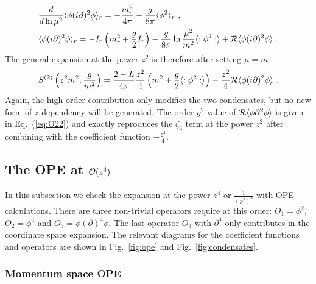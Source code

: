 \documentclass[a4paper,11pt]{article}
\begin{document}
\begin{align}
&\frac{d}{d \ln \mu^2}\langle \phi(i\partial)^2\phi\rangle_r=-\frac{m_r^2}{4\pi}-\frac{g}{8\pi}\langle\phi^2 \rangle_r \ , \\  
&\langle \phi(i\partial)^2\phi\rangle_r=-I_r\left(m_r^2+\frac{g}{2}I_r\right)-\frac{g}{8\pi}\ln\frac{\mu^2}{m^2}\langle :\phi^2:\rangle+{\cal R}\langle \phi (i\partial)^2\phi \rangle \ .
\end{align}
The general expansion at the power $z^2$ is therefore after setting $\mu=m$
\begin{align}
S^{(2)}\left(z^2m^2,\frac{g}{m^2}\right)=\frac{2-L}{4\pi}\frac{z^2}{4}\left(m^2+\frac{g}{2}\langle :\phi^2:\rangle\right)-\frac{z^2}{4}{\cal R}\langle \phi (i\partial)^2\phi \rangle \ . 
\end{align}
Again, the high-order contribution only modifies the two condensates, but no new form of $z$ dependency will be generated.  The order $g^2$ value of ${\cal R}\langle \phi \partial^2\phi\rangle$ is given in Eq.~(\ref{eq:O22}) and exactly reproduces the $\zeta_3$ term at the power $z^2$ after combining with the coefficient function $-\frac{z^2}{4}$. 




\subsection{The OPE at ${\cal O}(z^4)$}
In this subsection we check the expansion at the power $z^4$ or $\frac{1}{(p^2)^3}$
with OPE calculations. There are three non-trivial operators require at this order: $O_1=\phi^2$, $O_2=\phi^4$ and $O_3=\phi(\partial)^4\phi$. The last operator $O_3$ with $\partial^4$ only contributes in the coordinate space expansion.  The relevant diagrams for the coefficient functions and operators are shown in Fig.~\ref{fig:ope} and Fig.~\ref{fig:condensates}. 


 
\subsubsection{Momentum space OPE}
\end{document}
